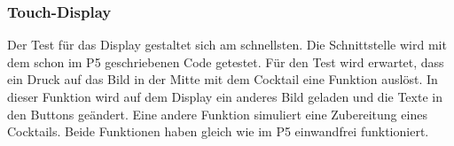 \subsubsection{Touch-Display}
\label{subsubsec:Inbetriebnahme_Touch_Display}

Der Test für das Display gestaltet sich am schnellsten. Die Schnittstelle wird mit dem schon im P5 geschriebenen Code getestet. Für den Test wird erwartet, dass ein Druck auf das Bild in der Mitte mit dem Cocktail eine Funktion auslöst. In dieser Funktion wird auf dem Display ein anderes Bild geladen und die Texte in den Buttons geändert. Eine andere Funktion simuliert eine Zubereitung eines Cocktails. Beide Funktionen haben gleich wie im P5 einwandfrei funktioniert.